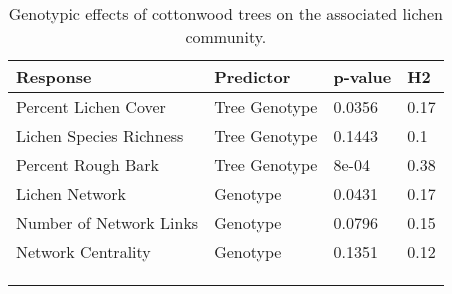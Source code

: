 \begin{table}[ht]
\centering
\begin{tabular}{llll}
  \hline
Response & Predictor & p-value & H2 \\ 
  \hline
Percent Lichen Cover & Tree Genotype & 0.0356 & 0.17 \\ 
  Lichen Species Richness & Tree Genotype & 0.1443 & 0.1 \\ 
  Percent Rough Bark & Tree Genotype & 8e-04 & 0.38 \\ 
  Lichen Network & Genotype & 0.0431 & 0.17 \\ 
  Number of Network Links & Genotype & 0.0796 & 0.15 \\ 
  Network Centrality & Genotype & 0.1351 & 0.12 \\ 
   &  &  &  \\ 
   &  &  &  \\ 
   &  &  &  \\ 
   \hline
\end{tabular}
\caption{Genotypic effects of cottonwood trees on the associated lichen community.} 
\label{tab:h2_table}
\end{table}
